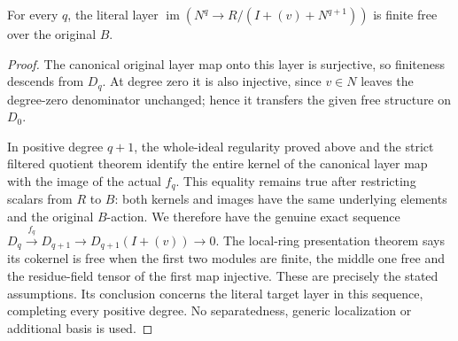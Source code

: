 \begin{theorem}
\label{hir:local-actual-symbol-quotient-layers-free}
\leanok
For every $q$, the literal layer
$\operatorname{im}(N^q\to R/(I+(v)+N^{q+1}))$ is finite free over the
original $B$.
\end{theorem}
\begin{proof}
The canonical original layer map onto this layer is surjective, so
finiteness descends from $D_q$. At degree zero it is also injective,
since $v\in N$ leaves the degree-zero denominator unchanged; hence
it transfers the given free structure on $D_0$.

In positive degree $q+1$, the whole-ideal regularity proved above and
the strict filtered quotient theorem identify the entire kernel of
the canonical layer map with the image of the actual $f_q$. This
equality remains true after restricting scalars from $R$ to $B$:
both kernels and images have the same underlying elements and the
original $B$-action. We therefore have the genuine exact sequence
$D_q\xrightarrow{f_q}D_{q+1}\to D_{q+1}(I+(v))\to0$.
The local-ring presentation theorem says its cokernel is free when
the first two modules are finite, the middle one free and the
residue-field tensor of the first map injective. These are precisely
the stated assumptions. Its conclusion concerns the literal target
layer in this sequence, completing every positive degree. No
separatedness, generic localization or additional basis is used.
\end{proof}
